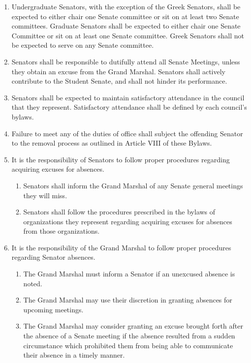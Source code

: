 \begin{enumerate}
\item Undergraduate Senators, with the exception of the Greek Senators, shall be expected to either chair one Senate committee or sit on at least two Senate committees. Graduate Senators shall be expected to either chair one Senate Committee or sit on at least one Senate committee. Greek Senators shall not be expected to serve on any Senate committee.
\item Senators shall be responsible to dutifully attend all Senate Meetings, unless they obtain an excuse from the Grand Marshal. Senators shall actively contribute to the Student Senate, and shall not hinder its performance.
\item Senators shall be expected to maintain satisfactory attendance in the council that they represent. Satisfactory attendance shall be defined by each council’s bylaws.
\item Failure to meet any of the duties of office shall subject the offending Senator to the removal process as outlined in Article VIII of these Bylaws.
\item It is the responsibility of Senators to follow proper procedures regarding acquiring excuses for absences.
  \begin{enumerate}
  \item Senators shall inform the Grand Marshal of any Senate general meetings they will miss.
  \item Senators shall follow the procedures prescribed in the bylaws of organizations they represent regarding acquiring excuses for absences from those organizations.
  \end{enumerate}
\item It is the responsibility of the Grand Marshal to follow proper procedures regarding Senator absences.
  \begin{enumerate}
  \item The Grand Marshal must inform a Senator if an unexcused absence is noted.
  \item The Grand Marshal may use their discretion in granting absences for upcoming meetings.
  \item The Grand Marshal may consider granting an excuse brought forth after the absence of a Senate meeting if the absence resulted from a sudden circumstance which prohibited them from being able to communicate their absence in a timely manner.
  \end{enumerate}
\end{enumerate}


